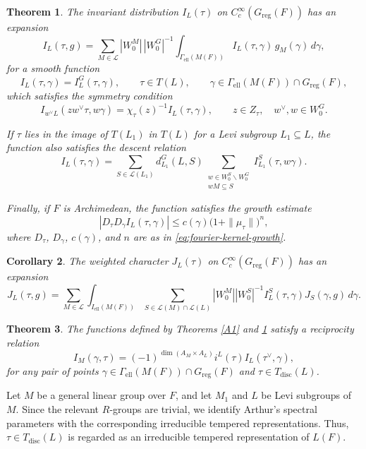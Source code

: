\documentclass[11pt]{amsart}
\newtheorem {theorem}    {Theorem}[section]
\newtheorem {corollary}  [theorem]    {Corollary}
\theoremstyle{definition}
\numberwithin{equation}{section}
\begin{document}
	\begin{theorem}\label{A2}
The invariant distribution \(I_L(\tau)\) on
\(C_c^\infty(G_{\mathrm{reg}}(F))\) has an expansion
\begin{equation}
I_L(\tau,g)
=
\sum_{M\in\mathcal{L}}
|W_0^M|\,|W_0^G|^{-1}
\int_{\Gamma_{\mathrm{ell}}(M(F))}
I_L(\tau,\gamma)\,g_M(\gamma)\,d\gamma,
\end{equation}
for a smooth function
\[
I_L(\tau,\gamma)=I_L^G(\tau,\gamma),
\qquad
\tau\in T(L),
\qquad
\gamma\in
\Gamma_{\mathrm{ell}}(M(F))
\cap G_{\mathrm{reg}}(F),
\]
which satisfies the symmetry condition
\begin{equation}
I_{w^\vee L}(z w^\vee\tau,w\gamma)
=
\chi_\tau(z)^{-1}I_L(\tau,\gamma),
\qquad
z\in Z_\tau,
\quad
w^\vee,w\in W_0^G.
\end{equation}

If \(\tau\) lies in the image of \(T(L_1)\) in \(T(L)\)
for a Levi subgroup \(L_1\subseteq L\), the function
also satisfies the descent relation
\begin{equation}
I_L(\tau,\gamma)
=
\sum_{S\in\mathcal{L}(L_1)}
d_{L_1}^G(L,S)
\sum_{\substack{
w\in W_0^S\backslash W_0^G\\
wM\subseteq S
}}
I_{L_1}^S(\tau,w\gamma).
\end{equation}

Finally, if \(F\) is Archimedean, the function satisfies
the growth estimate
\begin{equation}
\left|
D_\tau D_\gamma I_L(\tau,\gamma)
\right|
\leq
c(\gamma)\bigl(1+\|\mu_\tau\|\bigr)^n,
\end{equation}
where \(D_\tau\), \(D_\gamma\), \(c(\gamma)\), and \(n\)
are as in \eqref{eq:fourier-kernel-growth}.
\end{theorem}
	
	\begin{corollary}
		The weighted character \( J_L(\tau) \) on \( C_c^\infty(G_{\mathrm{reg}}(F)) \) has an expansion
		\[
		J_L(\tau, g) = \sum_{M \in \mathcal{L}} \int_{I_{\mathrm{ell}}(M(F))} \sum_{S \in \mathcal{L}(M) \cap \mathcal{L}(L)} |W_0^M| |W_0^S|^{-1} I_L^S(\tau, \gamma) J_S(\gamma, g) \, d\gamma.
		\]
	\end{corollary}
	
	\begin{theorem}\label{reciprocity}
		The functions defined by Theorems \ref{A1} and \ref{A2} satisfy a reciprocity relation
		\[
		I_M(\gamma, \tau) = (-1)^{\dim(A_M \times A_L)} i^L(\tau) I_L(\tau^\vee, \gamma),
		\]
		for any pair of points \(\gamma \in \Gamma_{\mathrm{ell}}(M(F)) \cap G_{\mathrm{reg}}(F)\) and \(\tau \in T_{\mathrm{disc}}(L)\).
	\end{theorem}
    Let $M$ be a general linear group over $F$, and let $M_1$
and $L$ be Levi subgroups of $M$. Since the relevant
$R$-groups are trivial, we identify Arthur's spectral
parameters with the corresponding irreducible tempered
representations. Thus, $\tau\in T_{\mathrm{disc}}(L)$
is regarded as an irreducible tempered representation
of $L(F)$.
\end{document}
